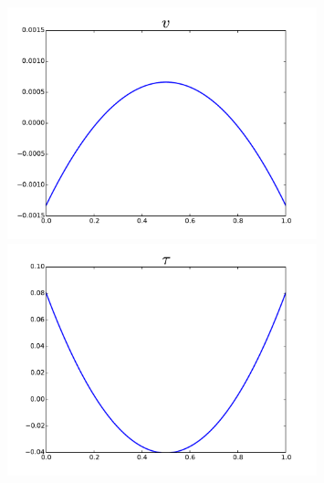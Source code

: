 \documentclass[18pt,xcolor=table]{beamer}
\begin{document}
\begin{frame}[t]
\begin{columns}
\begin{column}{0.5\textwidth}
\begin{figure}[t]
\includegraphics[width=0.8\textwidth]{OptimalTestFunctions/uLinear_1e-2/steady/coupledrobust_steady_v_approx3.pdf}\\
\includegraphics[width=0.8\textwidth]{OptimalTestFunctions/uLinear_1e-2/steady/coupledrobust_steady_tau_approx3.pdf}
\end{figure}
\end{column}
\end{columns}
\end{frame}
\end{document}
